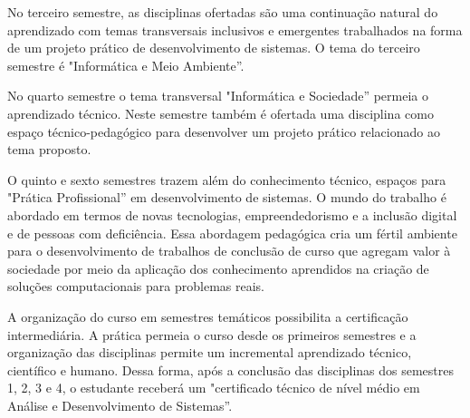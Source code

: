 \documentclass[
	10pt,				%
	openright,			%
	twoside,			%
	a4paper,			%
	english,			%
	french,				%
	brazil,				%
	sumario=tradicional
]{abntex2}
\begin{document}
No terceiro semestre, as disciplinas ofertadas são uma continuação natural do aprendizado com temas transversais inclusivos e emergentes trabalhados na forma de um projeto prático de desenvolvimento de sistemas.
O tema do terceiro semestre é "Informática e Meio Ambiente''.

No quarto semestre o tema transversal "Informática e Sociedade'' permeia o aprendizado técnico.
Neste semestre também é ofertada uma disciplina como espaço técnico-pedagógico para desenvolver um projeto prático relacionado ao tema proposto.

O quinto e sexto semestres trazem além do conhecimento técnico, espaços para "Prática Profissional'' em desenvolvimento de sistemas.
O mundo do trabalho é abordado em termos de novas tecnologias, empreendedorismo e a inclusão digital e de pessoas com deficiência.
Essa abordagem pedagógica cria um fértil ambiente para o desenvolvimento de trabalhos de conclusão de curso que agregam valor à sociedade por meio da aplicação dos conhecimento aprendidos na criação de soluções computacionais para problemas reais.

A organização do curso em semestres temáticos possibilita a certificação intermediária.
A prática permeia o curso desde os primeiros semestres e a organização das disciplinas permite um incremental aprendizado técnico, científico e humano.
Dessa forma, após a conclusão das disciplinas dos semestres 1, 2, 3 e 4, o estudante receberá um "certificado técnico de nível médio em Análise e Desenvolvimento de Sistemas''.

\vfill
\end{document}
